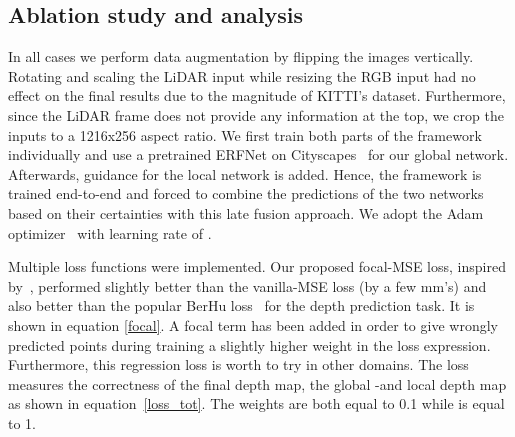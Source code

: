 \documentclass{main_style}
\begin{document}
\subsection{Ablation study and analysis}
In all cases we perform data augmentation by flipping the images vertically. Rotating and scaling the LiDAR input while resizing the RGB input had no effect on the final results due to the magnitude of KITTI's dataset. Furthermore, since the LiDAR frame does not provide any information at the top, we crop the inputs to a 1216x256 aspect ratio. We first train both parts of the framework individually and use a pretrained ERFNet on Cityscapes~\cite{citiscapes} for our global network. Afterwards, guidance for the local network is added. Hence, the framework is trained end-to-end and forced to combine the predictions of the two networks based on their certainties with this late fusion approach. We adopt the Adam optimizer~\cite{adam} with learning rate of .  

Multiple loss functions were implemented. Our proposed focal-MSE loss, inspired by~\cite{focal}, performed slightly better than the vanilla-MSE loss (by a few mm's) and also better than the popular BerHu loss~\cite{berhu} for the depth prediction task. It is shown in equation \ref{focal}. A focal term has been added in order to give wrongly predicted points during training a slightly higher weight in the loss expression. Furthermore, this regression loss is worth to try in other domains. The loss measures the correctness of the final depth map, the global -and local depth map as shown in equation~\ref{loss_tot}. The weights  are both equal to 0.1 while  is equal to 1.
\end{document}
